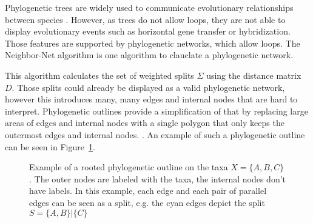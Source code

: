 Phylogenetic trees are widely used to communicate evolutionary relationships
between species
\cite{mandalComparativeGenomeAnalysis2022,winkworthComparativeAnalysesComplete2022,ayala-usmaWholeGenomeDuplication2021}.
However, as trees do not allow loops, they are not able to display evolutionary
events such as horizontal gene transfer or hybridization. Those features are
supported by phylogenetic networks, which allow loops.  The
Neighbor-Net algorithm \cite{bryantNeighborNetAgglomerativeMethod2004} is one
algorithm to clauclate a phylogenetic network. 

This algorithm calculates the set of weighted splits $\Sigma$ using the distance
matrix $D$. Those splits could already be displayed as a valid phylogenetic
network, however this introduces many, many edges and internal nodes that are
hard to interpret. Phylogenetic outlines provide a simplification of that by
replacing large areas of edges and internal nodes with a single polygon that
only keeps the outermost edges and internal nodes.
\cite{bagciMicrobialPhylogeneticContext2021}. An example of such a phylogenetic
outline can be seen in Figure~\ref{fig:outlineExample}. 

\begin{figure}
  \centering
  \caption{Example of a rooted phylogenetic outline on the taxa $X = \{A, B,
  C\}$. The outer nodes are labeled with the taxa, the internal nodes don't have
  labels. In this example, each edge and each pair of parallel edges can be seen
  as a split, e.g. the cyan edges depict the split $S = \{A, B\} | \{C\}$}
  \label{fig:outlineExample}
\end{figure}

